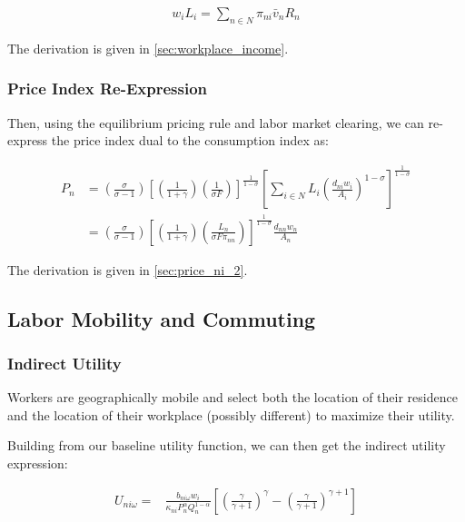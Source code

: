 \documentclass[10pt]{article}
\begin{document}
\begin{align}
    w_i L_i=\sum_{n \in N} \pi_{n i} \bar{v}_n R_n \label{eq:workplace_income}
\end{align}

The derivation is given in \autoref{sec:workplace_income}.

\subsubsection{Price Index Re-Expression}

Then, using the equilibrium pricing rule
and labor market clearing, we can 
re-express the price index dual to the consumption index as:

\begin{align}
    P_n & =\left(\frac{\sigma}{\sigma-1}\right) \left[\left(\frac{1}{1 + \gamma}\right) \left(\frac{1}{\sigma F}\right)\right]^{\frac{1}{1-\sigma}} \left[\sum_{i \in N} L_i \left(\frac{d_{ni} w_i}{A_i}\right)^{1-\sigma}\right]^{\frac{1}{1-\sigma}} \\
    & =\left(\frac{\sigma}{\sigma-1}\right) \left[\left(\frac{1}{1 + \gamma}\right) \left(\frac{L_n}{\sigma F \pi_{nn}}\right)\right]^{\frac{1}{1-\sigma}} \frac{d_{nn} w_n}{A_n} \label{eq:price_index_p_n_2}
\end{align}

The derivation is given in \autoref{sec:price_ni_2}.

\subsection{Labor Mobility and Commuting}

\subsubsection{Indirect Utility}

Workers are geographically mobile and select 
both the location of their residence and the location of 
their workplace (possibly different) to maximize their 
utility. 

Building from our baseline utility function,
 we can 
then get the indirect utility expression:

\begin{align}
    U_{n i \omega}= & \frac{b_{n i \omega} w_i}{\kappa_{n i} P_n^\alpha Q_n^{1-\alpha}} \left[\left(\frac{\gamma}{\gamma+1}\right)^\gamma-\left(\frac{\gamma}{\gamma+1}\right)^{\gamma+1}\right] \label{eq:indirect_utility}
\end{align}
\end{document}
